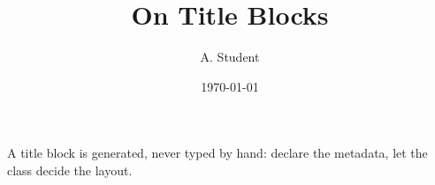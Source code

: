 \documentclass{article}
\title{On Title Blocks}
\author{A. Student}
\date{\today}
\begin{document}
\maketitle

A title block is generated, never typed by hand: declare the metadata,
let the class decide the layout.
\end{document}
